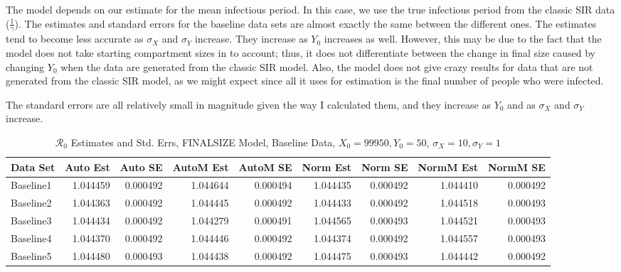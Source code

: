 \documentclass[12pt]{article}
\newcommand{\rr}{\ensuremath{\mathcal{R}_0}}
\begin{document}
The model depends on our estimate for the mean infectious period. In this case, we use the true infectious period from the classic SIR data ($\frac{1}{\gamma}$). The estimates and standard errors for the baseline data sets are almost exactly the same between the different ones. The estimates tend to become less accurate as $\sigma_X$ and $\sigma_Y$ increase. They increase as $Y_0$ increases as well. However, this may be due to the fact that the model does not take starting compartment sizes in to account; thus, it does not differentiate between the change in final size caused by changing $Y_0$ when the data are generated from the classic SIR model. Also, the model does not give crazy results for data that are not generated from the classic SIR model, as we might expect since all it uses for estimation is the final number of people who were infected.

The standard errors are all relatively small in magnitude given the way I calculated them, and they increase as $Y_0$ and as $\sigma_X$ and $\sigma_Y$ increase.

\begin{table}[H]
	
	\caption{$\rr$ Estimates and Std. Errs, FINALSIZE Model, 
		Baseline Data, $X_0 = 99950, Y_0 = 50$, 
		$\sigma_X = 10, \sigma_Y = 1$}
	\begin{footnotesize}
		\hskip -1cm
		\begin{tabular}{l|r|r|r|r|r|r|r|r}
			\hline
			Data Set & Auto Est & Auto SE & AutoM Est & AutoM SE & Norm Est & Norm SE & NormM Est & NormM SE\\
			\hline
			Baseline1 & 1.044459 & 0.000492 & 1.044644 & 0.000494 & 1.044435 & 0.000492 & 1.044410 & 0.000492\\
			\hline
			Baseline2 & 1.044363 & 0.000492 & 1.044445 & 0.000492 & 1.044433 & 0.000492 & 1.044518 & 0.000493\\
			\hline
			Baseline3 & 1.044434 & 0.000492 & 1.044279 & 0.000491 & 1.044565 & 0.000493 & 1.044521 & 0.000493\\
			\hline
			Baseline4 & 1.044370 & 0.000492 & 1.044446 & 0.000492 & 1.044374 & 0.000492 & 1.044557 & 0.000493\\
			\hline
			Baseline5 & 1.044480 & 0.000493 & 1.044438 & 0.000492 & 1.044475 & 0.000493 & 1.044442 & 0.000492\\
			\hline
		\end{tabular}
	\end{footnotesize}
\end{table}
\end{document}
